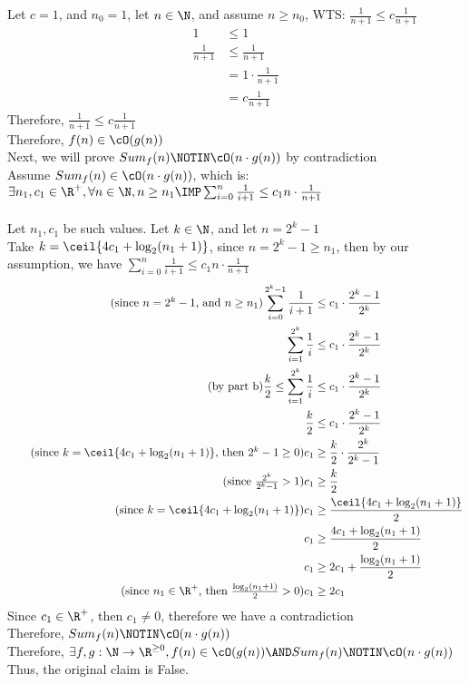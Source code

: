 \documentclass[12pt]{article}
\begin{document}
Let $c = 1$, and $n_0 = 1$, let $n \in \N$, and assume $n \ge n_0$, WTS: $\frac{1}{n+1} \le c\frac{1}{n+1}$\\
\begin{align*}
    1 &\le 1\\
    \tag{since by our assumption, $n \ge n_0 = 1$, then $n+1 > 0$}
    \frac{1}{n+1} &\le \frac{1}{n+1}\\
    &= 1 \cdot \frac{1}{n+1}\\
    &= c\frac{1}{n+1}
\end{align*}
Therefore, $\frac{1}{n+1} \le c\frac{1}{n+1}$\\
Therefore, $f(n) \in \cO(g(n))$\\
\newpage
\noindent Next, we will prove $Sum_f(n) \NOTIN \cO(n \cdot g(n))$ by contradiction\\
Assume $Sum_f(n) \in \cO(n\cdot g(n))$, which is: $\exists n_1,c_1\in \R^{+}, \forall n \in \N, n \ge n_1 \IMP \sum_{i = 0}^{n}\frac{1}{i+1} \le c_1n\cdot \frac{1}{n + 1}$\\
\\
Let $n_1,c_1$ be such values. Let $k \in \N$, and let $n = 2^k - 1$\\
Take $k = \ceil{4c_1 + \log_{2}(n_1 + 1)}$, since $n = 2^k - 1 \ge n_1$, then by our assumption, we have $\sum_{i = 0}^{n}\frac{1}{i+1} \le c_1n\cdot \frac{1}{n+1}$\\
\begin{align*}
    \tag{since $n = 2^k - 1$, and $n \ge n_1$}
    \sum_{i = 0}^{2^k - 1}\frac{1}{i+1} &\le c_1 \cdot \frac{2^k - 1}{2^k}\\
    \sum_{i = 1}^{2^k}\frac{1}{i} &\le c_1\cdot \frac{2^k - 1}{2^k}\\
    \tag{by part b}
    \frac{k}{2} \le \sum_{i = 1}^{2^k}\frac{1}{i} &\le c_1\cdot \frac{2^k - 1}{2^k}\\
    \frac{k}{2} &\le c_1\cdot \frac{2^k - 1}{2^k}\\
    \tag{since $k =\ceil{4c_1 + \log_{2}(n_1 + 1)}$, then $2^k - 1 \ge 0$}
    c_1 &\ge \frac{k}{2}\cdot \frac{2^k}{2^k - 1}\\
    \tag{since $\frac{2^k}{2^k - 1} > 1$}
    c_1 &\ge \frac{k}{2}\\
    \tag{since $k = \ceil{4c_1 + \log_{2}(n_1 + 1)}$}
    c_1 &\ge \frac{\ceil{4c_1 + \log_{2}(n_1 + 1)}}{2}\\
    c_1 &\ge \frac{4c_1 + \log_{2}(n_1 + 1)}{2}\\
    c_1 &\ge 2c_1 + \frac{\log_{2}(n_1 + 1)}{2}\\
    \tag{since $n_1 \in \R^{+}$, then $\frac{\log_{2}(n_1 + 1)}{2} > 0$}
    c_1 &\ge 2c_1
\end{align*}
Since $c_1 \in \R^{+}$, then $c_1 \neq 0$, therefore we have a contradiction\\
Therefore, $Sum_f(n) \NOTIN \cO(n\cdot g(n))$\\
Therefore, $\exists f, g: \N \to \R^{\ge 0}, f(n) \in \cO(g(n)) \AND Sum_f(n) \NOTIN \cO(n\cdot g(n))$\\
Thus, the original claim is False.
\end{document}
